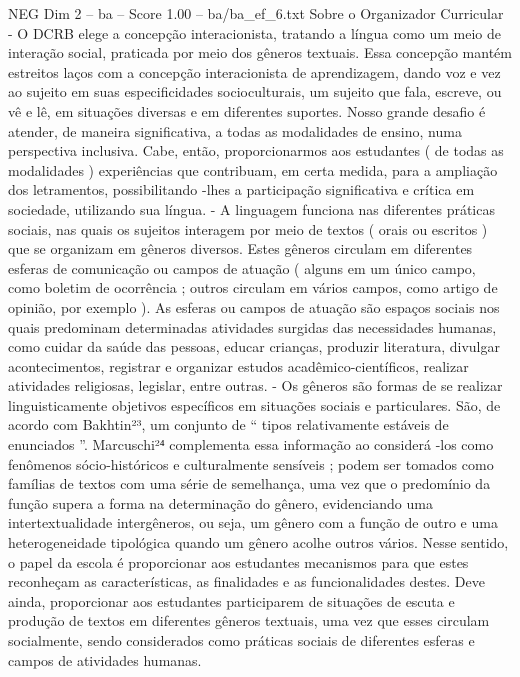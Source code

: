 \begin{textsample}{NEG Dim 2 – ba – Score 1.00 – ba/ba\_ef\_6.txt}  \label{ex:f2_neg_255}
Sobre o Organizador Curricular - O DCRB elege a concepção interacionista, tratando a língua como um meio de interação social, praticada por meio dos gêneros textuais.
Essa concepção mantém estreitos laços com a concepção interacionista de aprendizagem, dando voz e vez ao sujeito em suas especificidades socioculturais, um sujeito que fala, escreve, ou vê e lê, em situações diversas e em diferentes suportes.
Nosso grande desafio é atender, de maneira significativa, a todas as modalidades de ensino, numa perspectiva inclusiva.
Cabe, então, proporcionarmos aos estudantes ( de todas as modalidades ) experiências que contribuam, em certa medida, para a ampliação dos letramentos, possibilitando -lhes a participação significativa e crítica em sociedade, utilizando sua língua. - A linguagem funciona nas diferentes práticas sociais, nas quais os sujeitos interagem por meio de textos ( orais ou escritos ) que se organizam em gêneros diversos.
Estes gêneros circulam em diferentes esferas de comunicação ou campos de atuação ( alguns em um único campo, como boletim de ocorrência ; outros circulam em vários campos, como artigo de opinião, por exemplo ).
As esferas ou campos de atuação são espaços sociais nos quais predominam determinadas atividades surgidas das necessidades humanas, como cuidar da saúde das pessoas, educar crianças, produzir literatura, divulgar acontecimentos, registrar e organizar estudos acadêmico-científicos, realizar atividades religiosas, legislar, entre outras. - Os gêneros são formas de se realizar linguisticamente objetivos específicos em situações sociais e particulares.
São, de acordo com Bakhtin²³, um conjunto de “ tipos relativamente estáveis de enunciados ”.
Marcuschi²⁴ complementa essa informação ao considerá -los como fenômenos sócio-históricos e culturalmente sensíveis ; podem ser tomados como famílias de textos com uma série de semelhança, uma vez que o predomínio da função supera a forma na determinação do gênero, evidenciando uma intertextualidade intergêneros, ou seja, um gênero com a função de outro e uma heterogeneidade tipológica quando um gênero acolhe outros vários.
Nesse sentido, o papel da escola é proporcionar aos estudantes mecanismos para que estes reconheçam as características, as finalidades e as funcionalidades destes.
Deve ainda, proporcionar aos estudantes participarem de situações de escuta e produção de textos em diferentes gêneros textuais, uma vez que esses circulam socialmente, sendo considerados como práticas sociais de diferentes esferas e campos de atividades humanas.

\end{textsample}
